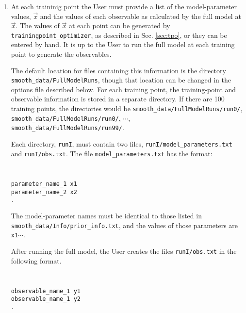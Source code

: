 \documentclass[UserManual.tex]{subfiles}
\begin{document}
\begin{enumerate}
\item At each traininig point the User must provide a list of the model-parameter values, $\vec{x}$ and the values of each observable as calculated by the full model at $\vec{x}$. The values of $\vec{x}$ at each point can be generated by {\tt trainingpoint\_optimizer}, as described in Sec. \ref{sec:tpo}, or they can be entered by hand. It is up to the User to run the full model at each training point to generate the observables.

The default location for files containing this information is the directory {\tt smooth\_data/FullModelRuns}, though that location can be changed in the options file described below. For each training point, the training-point and observable information is stored in a separate directory. If there are 100 training points, the directories would be {\tt smooth\_data/FullModelRuns/run0/}, {\tt smooth\_data/FullModelRuns/run0/}, $\cdots$, {\tt smooth\_data/FullModelRuns/run99/}.

Each directory, {\tt runI}, must contain two files, {\tt runI/model\_parameters.txt} and {\tt runI/obs.txt}. The file {\tt model\_parameters.txt} has the format:\\ 
{\tt
\begin{verbatim}
parameter_name_1 x1  
parameter_name_2 x2  
.
\end{verbatim}}
The model-parameter names must be identical to those listed in {\tt smooth\_data/Info/prior\_info.txt}, and the values of those parameters are {\tt x1}$\cdots$.

After running the full model, the User creates the files {\tt runI/obs.txt} in the following format. \\
{\tt
\begin{verbatim}
observable_name_1 y1 
observable_name_1 y2
.
\end{verbatim}}

\end{enumerate}
\end{document}
